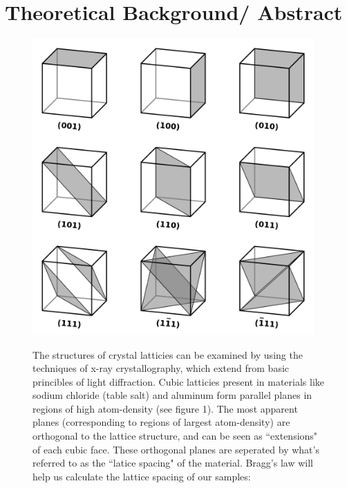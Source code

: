 \documentclass{amsart}
\begin{document}
\section{Theoretical Background/ Abstract}
\vspace{5pt}
\begin{figure}[H]
    \begin{minipage}{.35\textwidth}
        \includegraphics[width=0.96\textwidth]{Miller_Indices_Cubes.png}
        \caption{}
    \end{minipage}
    \begin{minipage}{.63\textwidth}
        The structures of crystal latticies can be examined by using the techniques of x-ray crystallography, which extend from basic princibles of light diffraction. Cubic latticies present in materials like sodium chloride (table salt) and aluminum form parallel planes in regions of high atom-density (see figure 1). The most apparent planes (corresponding to regions of largest atom-density) are orthogonal to the lattice structure, and can be seen as ``extensions" of each cubic face. These orthogonal planes are seperated by what's referred to as the ``latice spacing" of the material. Bragg's law will help us calculate the lattice spacing of our samples:
    \end{minipage}
\end{figure}
\end{document}
